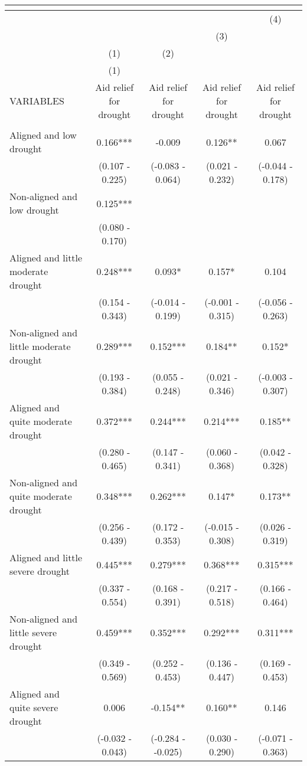 \begin{tabular}{lcccc}
\multicolumn{5}{c}{} \\ \hline
 &  &  &  & (4) \\
 &  &  & (3) &  \\
 & (1) & (2) &  &  \\
 & (1) &  &  &  \\
VARIABLES & Aid relief for drought & Aid relief for drought & Aid relief for drought & Aid relief for drought \\ \hline
 &  &  &  &  \\
Aligned and low drought & 0.166*** & -0.009 & 0.126** & 0.067 \\
 & (0.107 - 0.225) & (-0.083 - 0.064) & (0.021 - 0.232) & (-0.044 - 0.178) \\
Non-aligned and low drought & 0.125*** &  &  &  \\
 & (0.080 - 0.170) &  &  &  \\
Aligned and little moderate drought & 0.248*** & 0.093* & 0.157* & 0.104 \\
 & (0.154 - 0.343) & (-0.014 - 0.199) & (-0.001 - 0.315) & (-0.056 - 0.263) \\
Non-aligned and little moderate drought & 0.289*** & 0.152*** & 0.184** & 0.152* \\
 & (0.193 - 0.384) & (0.055 - 0.248) & (0.021 - 0.346) & (-0.003 - 0.307) \\
Aligned and quite moderate drought & 0.372*** & 0.244*** & 0.214*** & 0.185** \\
 & (0.280 - 0.465) & (0.147 - 0.341) & (0.060 - 0.368) & (0.042 - 0.328) \\
Non-aligned and quite moderate drought & 0.348*** & 0.262*** & 0.147* & 0.173** \\
 & (0.256 - 0.439) & (0.172 - 0.353) & (-0.015 - 0.308) & (0.026 - 0.319) \\
Aligned and little severe drought & 0.445*** & 0.279*** & 0.368*** & 0.315*** \\
 & (0.337 - 0.554) & (0.168 - 0.391) & (0.217 - 0.518) & (0.166 - 0.464) \\
Non-aligned and little severe drought & 0.459*** & 0.352*** & 0.292*** & 0.311*** \\
 & (0.349 - 0.569) & (0.252 - 0.453) & (0.136 - 0.447) & (0.169 - 0.453) \\
Aligned and quite severe drought & 0.006 & -0.154** & 0.160** & 0.146 \\
 & (-0.032 - 0.043) & (-0.284 - -0.025) & (0.030 - 0.290) & (-0.071 - 0.363) \\

\end{tabular}
